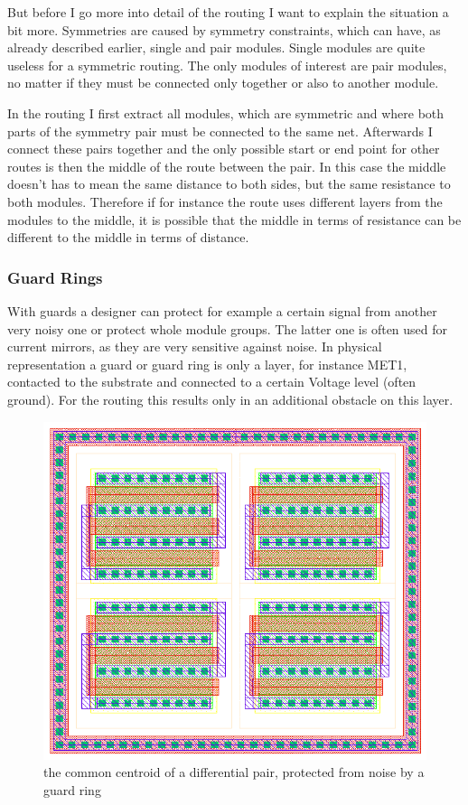 But before I go more into detail of the routing I want to explain the situation a bit more. Symmetries are caused by symmetry constraints, which can have, as already described earlier, single and pair modules. Single modules are quite useless for a symmetric routing. The only modules of interest are pair modules, no matter if they must be connected only together or also to another module.

In the routing I first extract all modules, which are symmetric and where both parts of the symmetry pair must be connected to the same net. Afterwards I connect these pairs together and the only possible start or end point for other routes is then the middle of the route between the pair. In this case the middle doesn't has to mean the same distance to both sides, but the same resistance to both modules. Therefore if for instance the route uses different layers from the modules to the middle, it is possible that the middle in terms of resistance can be different to the middle in terms of distance.

\subsubsection{Guard Rings}
With guards  a designer can protect for example a certain signal from another very noisy one or protect whole module groups. The latter one is often used for current mirrors, as they are very sensitive against noise. In physical representation a guard or guard ring is only a layer, for instance MET1, contacted to the substrate and connected to a certain Voltage level (often ground). For the routing this results only in an additional obstacle on this layer.

\begin{figure}
	\centering
	\includegraphics[scale=.6]{FIG/guard_ring.png}
  	\caption{the common centroid of a differential pair, protected from noise by a guard ring}
	\label{fig:guard_ring}
\end{figure}

